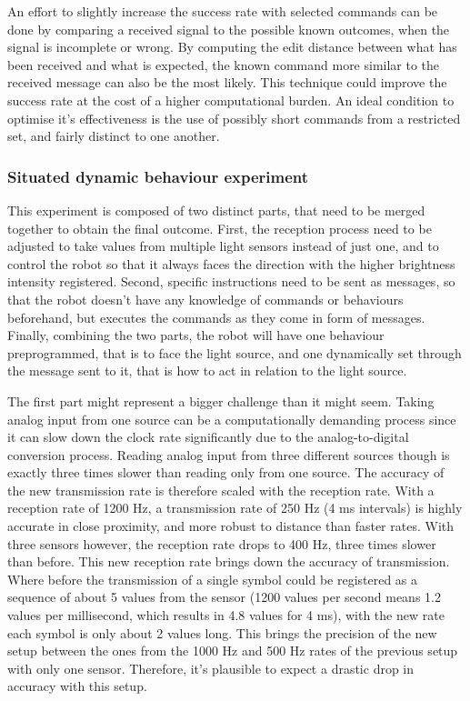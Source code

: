 An effort to slightly increase the success rate with selected commands can be done by comparing a received signal to the possible known outcomes, when the signal is incomplete or wrong.
By computing the edit distance between what has been received and what is expected, the known command more similar to the received message can also be the most likely.
This technique could improve the success rate at the cost of a higher computational burden.
An ideal condition to optimise it's effectiveness is the use of possibly short commands from a restricted set, and fairly distinct to one another.

\subsubsection{Situated dynamic behaviour experiment}
This experiment is composed of two distinct parts, that need to be merged together to obtain the final outcome.
First, the reception process need to be adjusted to take values from multiple light sensors instead of just one, and to control the robot so that it always faces the direction with the higher brightness intensity registered.
Second, specific instructions need to be sent as messages, so that the robot doesn't have any knowledge of commands or behaviours beforehand, but executes the commands as they come in form of messages.
Finally, combining the two parts, the robot will have one behaviour preprogrammed, that is to face the light source, and one dynamically set through the message sent to it, that is how to act in relation to the light source.

The first part might represent a bigger challenge than it might seem.
Taking analog input from one source can be a computationally demanding process since it can slow down the clock rate significantly due to the analog-to-digital conversion process.
Reading analog input from three different sources though is exactly three times slower than reading only from one source.
The accuracy of the new transmission rate is therefore scaled with the reception rate.
With a reception rate of 1200 Hz, a transmission rate of 250 Hz (4 ms intervals) is highly accurate in close proximity, and more robust to distance than faster rates.
With three sensors however, the reception rate drops to 400 Hz, three times slower than before.
This new reception rate brings down the accuracy of transmission.
Where before the transmission of a single symbol could be registered as a sequence of about 5 values from the sensor (1200 values per second means 1.2 values per millisecond, which results in 4.8 values for 4 ms), with the new rate each symbol is only about 2 values long.
This brings the precision of the new setup between the ones from the 1000 Hz and 500 Hz rates of the previous setup with only one sensor.
Therefore, it's plausible to expect a drastic drop in accuracy with this setup.

